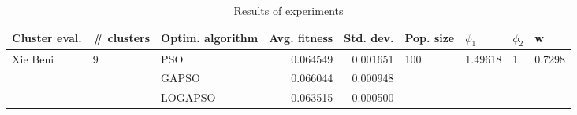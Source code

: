 \begin{table}
\centering
\caption{Results of experiments}
\begin{tabular}{lllrrllll}
\toprule
            Cluster eval. &        \# clusters & Optim. algorithm &  Avg. fitness &  Std. dev. &            Pop. size &               $\phi_{1}$ &         $\phi_{2}$ &                       w \\
\midrule
\multirow{3}{*}{Xie Beni} & \multirow{3}{*}{9} &              PSO &      0.064549 &   0.001651 & \multirow{3}{*}{100} & \multirow{3}{*}{1.49618} & \multirow{3}{*}{1} & \multirow{3}{*}{0.7298} \\
                          &                    &            GAPSO &      0.066044 &   0.000948 &                      &                          &                    &                         \\
                          &                    &          LOGAPSO &      0.063515 &   0.000500 &                      &                          &                    &                         \\
\bottomrule
\end{tabular}
\end{table}
